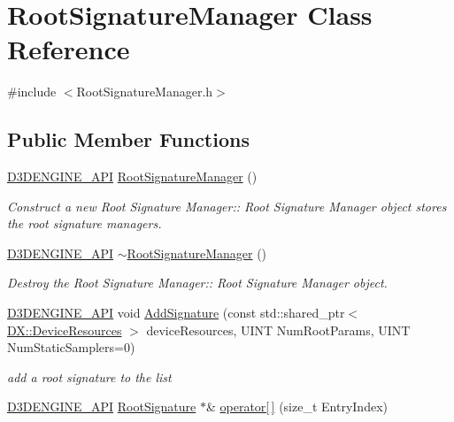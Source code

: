 \hypertarget{class_root_signature_manager}{}\section{Root\+Signature\+Manager Class Reference}
\label{class_root_signature_manager}


{\ttfamily \#include $<$Root\+Signature\+Manager.\+h$>$}

\subsection*{Public Member Functions}
\begin{DoxyCompactItemize}
\item 
\mbox{\hyperlink{stdafx_8h_a8ee2d990c5dfba7794dd2b60741d7722}{D3\+D\+E\+N\+G\+I\+N\+E\+\_\+\+A\+PI}} \mbox{\hyperlink{class_root_signature_manager_a21d3c6836d4876126278a0a697261e8a}{Root\+Signature\+Manager}} ()
\begin{DoxyCompactList}\small\item\em Construct a new Root Signature Manager\+:\+: Root Signature Manager object stores the root signature managers. \end{DoxyCompactList}\item 
\mbox{\hyperlink{stdafx_8h_a8ee2d990c5dfba7794dd2b60741d7722}{D3\+D\+E\+N\+G\+I\+N\+E\+\_\+\+A\+PI}} \mbox{\hyperlink{class_root_signature_manager_ac524bfff2dc4e5627ae949235f48e153}{$\sim$\+Root\+Signature\+Manager}} ()
\begin{DoxyCompactList}\small\item\em Destroy the Root Signature Manager\+:\+: Root Signature Manager object. \end{DoxyCompactList}\item 
\mbox{\hyperlink{stdafx_8h_a8ee2d990c5dfba7794dd2b60741d7722}{D3\+D\+E\+N\+G\+I\+N\+E\+\_\+\+A\+PI}} void \mbox{\hyperlink{class_root_signature_manager_a068bb9feb2700ec2beb8a3f900ee9f56}{Add\+Signature}} (const std\+::shared\+\_\+ptr$<$ \mbox{\hyperlink{class_d_x_1_1_device_resources}{D\+X\+::\+Device\+Resources}} $>$ device\+Resources, U\+I\+NT Num\+Root\+Params, U\+I\+NT Num\+Static\+Samplers=0)
\begin{DoxyCompactList}\small\item\em add a root signature to the list \end{DoxyCompactList}\item 
\mbox{\hyperlink{stdafx_8h_a8ee2d990c5dfba7794dd2b60741d7722}{D3\+D\+E\+N\+G\+I\+N\+E\+\_\+\+A\+PI}} \mbox{\hyperlink{class_root_signature}{Root\+Signature}} $\ast$\& \mbox{\hyperlink{class_root_signature_manager_a668be5bbf4145647bbe7678002fd5b05}{operator\mbox{[}$\,$\mbox{]}}} (size\+\_\+t Entry\+Index)

\end{DoxyCompactItemize}
